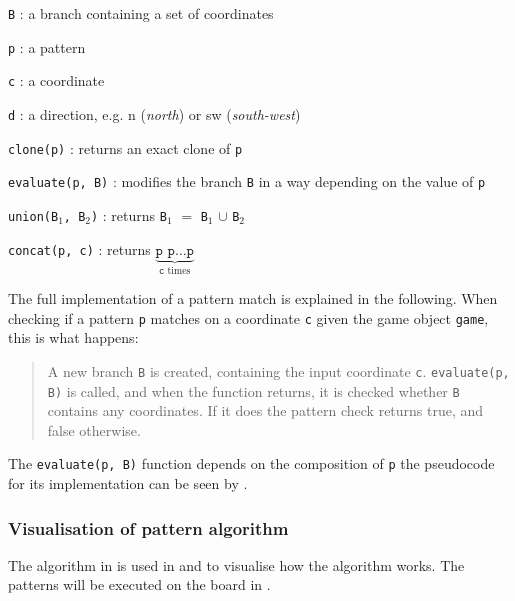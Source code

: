 \begin{dlist}
  \item \texttt{B} : a branch containing a set of coordinates
  \item \texttt{p} : a pattern
  \item \texttt{c} : a coordinate
  \item \texttt{d} : a direction, e.g. n (\textit{north}) or sw
    (\textit{south-west})
  \item \texttt{clone(p)} : returns an exact clone of \texttt{p}
  \item \texttt{evaluate(p, B)} : modifies the branch \texttt{B} in a way
    depending on the value of \texttt{p}
  \item \texttt{union(B$_1$, B$_2$)} : returns \texttt{B$_1$} $=$ \texttt{B$_1$} $\cup$
    \texttt{B$_2$}
  \item \texttt{concat(p, c)} : returns $\underbrace{\texttt{p p} \ldots
    \texttt{p}}_{\texttt{c}\text{ times}}$
\end{dlist}

The full implementation of a pattern match is explained in the following. When
checking if a pattern \texttt{p} matches on a coordinate \texttt{c} given the game object
\texttt{game}, this is what happens: 

\begin{quote}
  A new branch \texttt{B} is created, containing the input coordinate
  \texttt{c}.  \texttt{evaluate(p, B)} is called, and when the function returns,
  it is checked whether \texttt{B} contains any coordinates. If it does the
  pattern check returns true, and false otherwise.  
\end{quote}

The \texttt{evaluate(p, B)} function depends on the composition of \texttt{p} the
pseudocode for its implementation can be seen by .



\subsubsection{Visualisation of pattern algorithm}
\label{sec:vispatternalg}

The algorithm in  is used in  and
 to visualise how the algorithm works. The patterns will be
executed on the board in .

